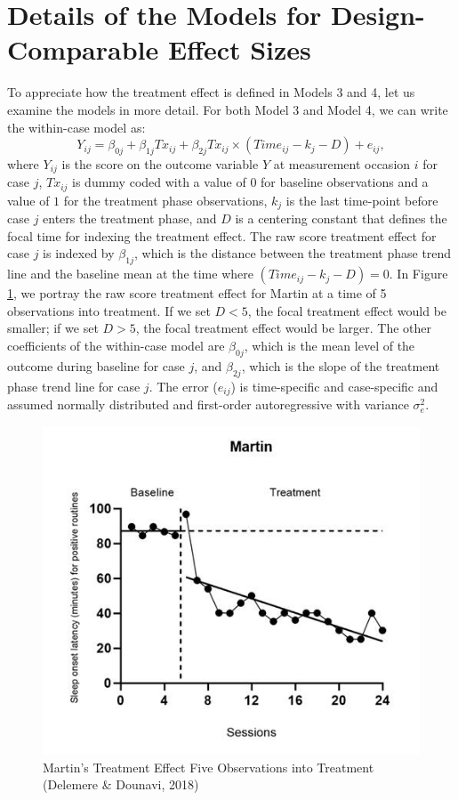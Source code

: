 \documentclass[
]{book}
\begin{document}
\hypertarget{details-of-the-models-for-design-comparable-effect-sizes}{%
\section{Details of the Models for Design-Comparable Effect Sizes}\label{details-of-the-models-for-design-comparable-effect-sizes}}

To appreciate how the treatment effect is defined in Models 3 and 4, let us examine the models in more detail. For both Model 3 and Model 4, we can write the within-case model as:
\begin{equation}
\label{eq:M3M4-L1}
Y_{ij} = \beta_{0j} + \beta_{1j}Tx_{ij} + \beta_{2j}Tx_{ij}\times(Time_{ij}-k_j-D) + e_{ij},
\end{equation}
where \(Y_{ij}\) is the score on the outcome variable \(Y\) at measurement occasion \(i\) for case \(j\), \(Tx_{ij}\) is dummy coded with a value of \(0\) for baseline observations and a value of \(1\) for the treatment phase observations, \(k_j\) is the last time-point before case \(j\) enters the treatment phase, and \(D\) is a centering constant that defines the focal time for indexing the treatment effect. The raw score treatment effect for case \(j\) is indexed by \(\beta_{1j}\), which is the distance between the treatment phase trend line and the baseline mean at the time where \((Time_{ij}-k_j-D)=0\). In Figure \ref{fig:Delemere-2018-Martin}, we portray the raw score treatment effect for Martin at a time of 5 observations into treatment. If we set \(D<5\), the focal treatment effect would be smaller; if we set \(D>5\), the focal treatment effect would be larger. The other coefficients of the within-case model are \(\beta_{0j}\), which is the mean level of the outcome during baseline for case \(j\), and \(\beta_{2j}\), which is the slope of the treatment phase trend line for case \(j\). The error (\(e_{ij}\)) is time-specific and case-specific and assumed normally distributed and first-order autoregressive with variance \(\sigma_e^2\).

\begin{figure}
\includegraphics[width=0.75\linewidth]{images/DelemereDounavi2018_Martin} \caption{Martin's Treatment Effect Five Observations into Treatment (Delemere \& Dounavi, 2018)}\label{fig:Delemere-2018-Martin}
\end{figure}
\end{document}
